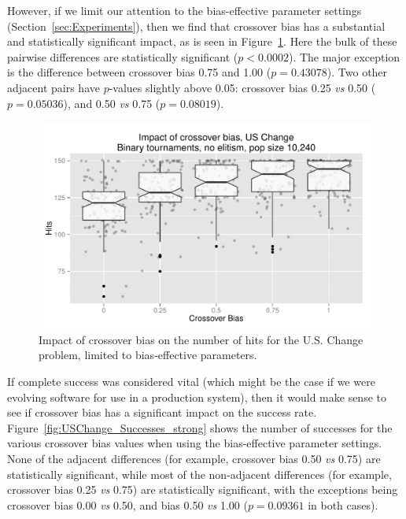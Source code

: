 \documentclass{sig-alternate}
\begin{document}
However, if we limit our attention to the bias-effective parameter settings (Section~\ref{sec:Experiments}), then we
find that crossover bias has a substantial and statistically significant impact, as is seen in
Figure~\ref{fig:USChange_Hits_strong}. Here the bulk of these pairwise differences are statistically significant
($p<0.0002$). The major exception is the difference between crossover bias 0.75 and 1.00 ($p=0.43078$). Two other
adjacent pairs have $p$-values slightly above 0.05: crossover bias 0.25 \emph{vs} 0.50 ($p=0.05036$), and 0.50
\emph{vs} 0.75 ($p=0.08019$).

\begin{figure}
\centering
\includegraphics[width=0.45 \textwidth]{Plots/US_change_hits_strong.pdf}
\caption{Impact of crossover bias on the number of hits for the U.S. Change problem, limited to bias-effective
parameters.}
\label{fig:USChange_Hits_strong}
\end{figure}

%
%
%
%

If complete success was considered vital (which might be the case if we were evolving software for use in a production
system), then it would make sense to see if crossover bias has a significant impact on the success rate.
Figure~\ref{fig:USChange_Successes_strong} shows the number of successes for the various crossover bias values when
using the bias-effective parameter settings. None of the adjacent differences (for example, crossover bias 0.50
\emph{vs} 0.75) are statistically significant, while most of the non-adjacent differences (for example, crossover bias
0.25 \emph{vs} 0.75) are statistically significant, with the exceptions being crossover bias 0.00 \emph{vs} 0.50, and
bias 0.50 \emph{vs} 1.00 ($p=0.09361$ in both cases).
\end{document}
